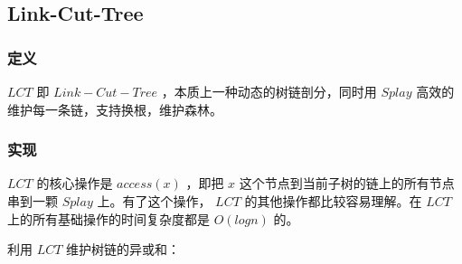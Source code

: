\documentclass[11pt]{article}
\begin{document}
\subsection{Link-Cut-Tree}
\label{sec-4-6}

\subsubsection{定义}
\label{sec-4-6-1}

$LCT$ 即 $Link-Cut-Tree$ ，本质上一种动态的树链剖分，同时用 $Splay$ 高效的维护每一条链，支持换根，维护森林。

\subsubsection{实现}
\label{sec-4-6-2}

$LCT$ 的核心操作是 $access(x)$ ，即把 $x$ 这个节点到当前子树的链上的所有节点串到一颗 $Splay$ 上。有了这个操作， $LCT$ 的其他操作都比较容易理解。在 $LCT$ 上的所有基础操作的时间复杂度都是 $O(logn)$ 的。

利用 $LCT$ 维护树链的异或和：
\end{document}
